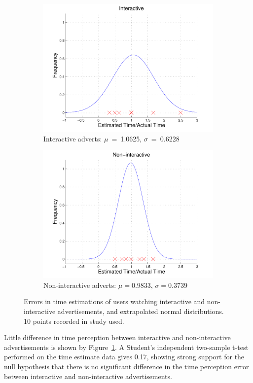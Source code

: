 	\begin{figure}[!ht]
		\centering
		\begin{subfigure}[h]{0.49\textwidth}
			\centering
			\includegraphics[width=\textwidth]{images/interactive_bell.pdf}
			\caption{Interactive adverts: $\mu$~=~1.0625, $\sigma$~=~0.6228}
		\end{subfigure}
		\begin{subfigure}[h]{0.49\textwidth}
			\centering
			\includegraphics[width=\textwidth]{images/noninteractive_bell.pdf}
			\caption{Non-interactive adverts: $\mu=0.9833$, $\sigma=0.3739$}
		\end{subfigure}
		\caption{Errors in time estimations of users watching interactive and non-interactive advertisements, and extrapolated normal distributions. 10 points recorded in study used.}
		\label{fig:time_perception}
	\end{figure}
	Little difference in time perception between interactive and non-interactive advertisements is shown by Figure~\ref{fig:time_perception}. A Student's independent two-sample t-test performed on the time estimate data gives 0.17, showing strong support for the null hypothesis that there is no significant difference in the time perception error between interactive and non-interactive advertisements.

